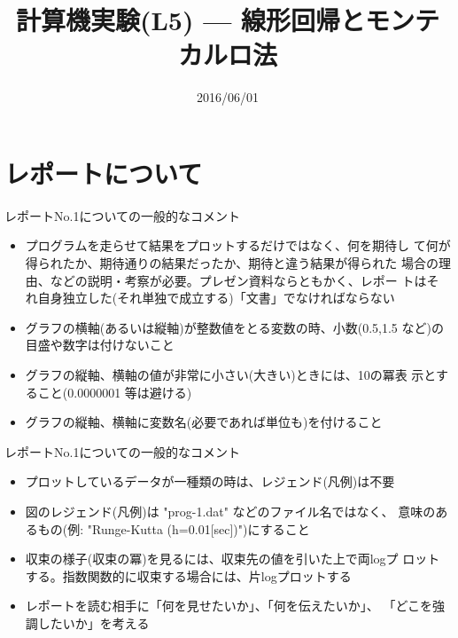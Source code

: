 \documentclass[dvipdfmx]{beamer}
\title{計算機実験(L5) --- 線形回帰とモンテカルロ法}
\date{2016/06/01}
\begin{document}
\begin{frame}
  \titlepage
  \tableofcontents
\end{frame}

\section{レポートについて}

\begin{frame}[t,fragile]{レポートNo.1についての一般的なコメント}
  \begin{itemize}
  \item プログラムを走らせて結果をプロットするだけではなく、何を期待し
    て何が得られたか、期待通りの結果だったか、期待と違う結果が得られた
    場合の理由、などの説明・考察が必要。プレゼン資料ならともかく、レポー
    トはそれ自身独立した(それ単独で成立する)「文書」でなければならない
  \item グラフの横軸(あるいは縦軸)が整数値をとる変数の時、小数(0.5,1.5
    など)の目盛や数字は付けないこと
  \item グラフの縦軸、横軸の値が非常に小さい(大きい)ときには、10の冪表
    示とすること(0.0000001 等は避ける)
  \item グラフの縦軸、横軸に変数名(必要であれば単位も)を付けること
  \end{itemize}
\end{frame}

\begin{frame}[t,fragile]{レポートNo.1についての一般的なコメント}
  \begin{itemize}
  \item プロットしているデータが一種類の時は、レジェンド(凡例)は不要
  \item 図のレジェンド(凡例)は "prog-1.dat" などのファイル名ではなく、
    意味のあるもの(例: "Runge-Kutta (h=0.01[sec])")にすること
  \item 収束の様子(収束の冪)を見るには、収束先の値を引いた上で両logプ
    ロットする。指数関数的に収束する場合には、片logプロットする
    \\[2em]
  \item レポートを読む相手に「何を見せたいか」、「何を伝えたいか」、
    「どこを強調したいか」を考える
  \end{itemize}
\end{frame}







\end{document}
